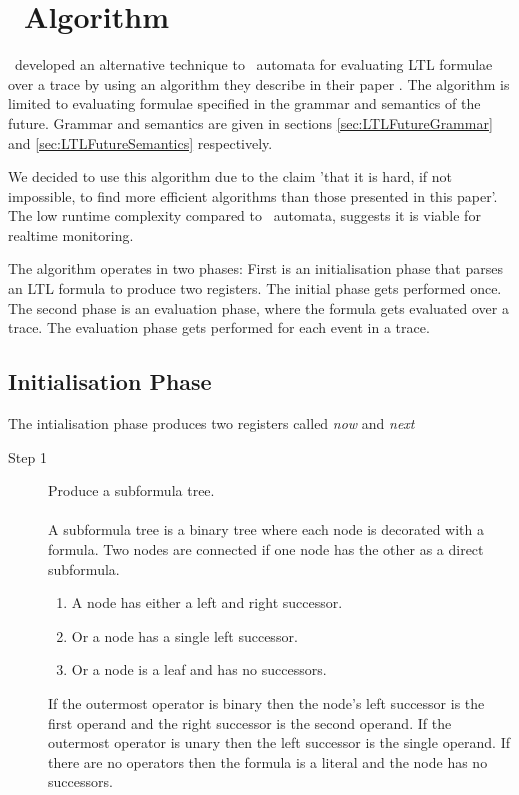 \chapter{\RH\ Algorithm}
\label{chap:Rosu-Havelund Algorithm}

\GRKH\ developed an alternative technique to \Buchi\ automata for evaluating LTL formulae over a trace by using an algorithm they describe in their paper \cite{RosuHavelund}. The algorithm is limited to evaluating formulae specified in the grammar and semantics of the future. Grammar and semantics are given in sections \ref{sec:LTLFutureGrammar} and \ref{sec:LTLFutureSemantics} respectively.

We decided to use this algorithm due to the claim 'that it is hard, if not impossible, to find more efficient algorithms than those presented in this paper'. The low runtime complexity compared to \Buchi\ automata, suggests it is viable for realtime monitoring.

The algorithm operates in two phases: First is an initialisation phase that parses an LTL formula to produce two registers.  The initial phase gets performed once.  The second phase is an evaluation phase, where the formula gets evaluated over a trace. The evaluation phase gets performed for each event in a trace.

\section{Initialisation Phase}
\label{sec:InitialisationPhase}
The intialisation phase produces two registers called \textit{now} and \textit{next}

\begin{description}
\item[Step 1] Produce a subformula tree.\\
\\
A subformula tree is a binary tree where each node is decorated with a formula.  Two nodes are connected if one node has the other as a direct subformula.

\begin{enumerate}
\item A node has either a left and right successor.
\item Or a node has a single left successor.
\item Or a node is a leaf and has no successors.
\end{enumerate}

If the outermost operator is binary then the node's left successor is the first operand and the right successor is the second operand.  If the outermost operator is unary then the left successor is the single operand.  If there are no operators then the formula is a literal and the node has no successors.\\\end{description}

